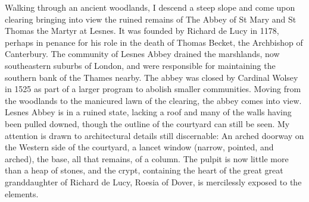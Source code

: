 Walking through an ancient woodlands, I descend a steep slope and come upon clearing bringing into view the ruined remains of The Abbey of St Mary and St Thomas the Martyr at Lesnes. It was founded by Richard de Lucy in 1178, perhaps in penance for his role in the death of Thomas Becket, the Archbishop of Canterbury. The community of Lesnes Abbey drained the marshlands, now southeastern suburbs of London, and were responsible for maintaining the southern bank of the Thames nearby. The abbey was closed by Cardinal Wolsey in 1525 as part of a larger program to abolish smaller communities. Moving from the woodlands to the manicured lawn of the clearing, the abbey comes into view. Lesnes Abbey is in a ruined state, lacking a roof and many of the walls having been pulled downed, though the outline of the courtyard can still be seen.
%
My attention is drawn to architectural details still discernable: An arched doorway on the Western side of the courtyard, a lancet window (narrow, pointed, and arched), the base, all that remains, of a column. The pulpit is now little more than a heap of stones, and the crypt, containing the heart of the great great granddaughter of Richard de Lucy, Roesia of Dover, is mercilessly exposed to the elements.
%

